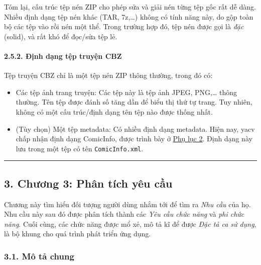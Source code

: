\documentclass[
]{article}
\providecommand{\tightlist}{%
  \setlength{\itemsep}{0pt}\setlength{\parskip}{0pt}}
\begin{document}
Tóm lại, cấu trúc tệp nén ZIP cho phép sửa và giải nén từng tệp gốc rất
dễ dàng. Nhiều định dạng tệp nén khác (TAR, 7z,\ldots) không có tính
năng này, do gộp toàn bộ các tệp vào rồi nén một thể. Trong trường hợp
đó, tệp nén được gọi là \emph{đặc} (solid), và rất khó để đọc/sửa tệp
lẻ.

\hypertarget{ux111ux1ecbnh-dux1ea1ng-tux1ec7p-truyux1ec7n-cbz}{%
\paragraph{\texorpdfstring{2.5.2. Định dạng tệp truyện CBZ
}{2.5.2. Định dạng tệp truyện CBZ }}\label{ux111ux1ecbnh-dux1ea1ng-tux1ec7p-truyux1ec7n-cbz}}

Tệp truyện CBZ chỉ là một tệp nén ZIP thông thường, trong đó có:

\begin{itemize}
\tightlist
\item
  Các tệp ảnh trang truyện: Các tệp này là tệp ảnh JPEG, PNG,\ldots{}
  thông thường. Tên tệp được đánh số tăng dần để biểu thị thứ tự trang.
  Tuy nhiên, không có một cấu trúc/định dạng tên tệp nào được thống
  nhất.
\item
  (Tùy chọn) Một tệp metadata: Có nhiều định dạng metadata. Hiện nay,
  yacv chấp nhận định dạng ComicInfo, được trình bày ở
  \protect\hyperlink{P8.2-comicinfo.xsd}{Phụ lục 2}. Định dạng này lưu
  trong một tệp có tên \texttt{ComicInfo.xml}.
\end{itemize}

\begin{center}\rule{0.5\linewidth}{0.5pt}\end{center}

\hypertarget{chux1b0ux1a1ng-3-phuxe2n-tuxedch-yuxeau-cux1ea7u}{%
\subsection{\texorpdfstring{3. Chương 3: Phân tích yêu cầu
}{3. Chương 3: Phân tích yêu cầu }}\label{chux1b0ux1a1ng-3-phuxe2n-tuxedch-yuxeau-cux1ea7u}}

Chương này tìm hiểu đối tượng người dùng nhắm tới để tìm ra \emph{Nhu
cầu} của họ. Nhu cầu này sau đó được phân tích thành các \emph{Yêu cầu
chức năng} và \emph{phi chức năng}. Cuối cùng, các chức năng được mổ xẻ,
mô tả kĩ để được \emph{Đặc tả ca sử dụng}, là bộ khung cho quá trình
phát triển ứng dụng.

\hypertarget{muxf4-tux1ea3-chung}{%
\subsubsection{\texorpdfstring{3.1. Mô tả chung
}{3.1. Mô tả chung }}\label{muxf4-tux1ea3-chung}}
\end{document}
